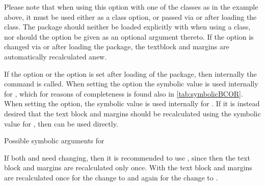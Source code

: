 Please note that when using this option with one of the {\KOMAScript}
classes as in the example above, it must be used either as a class
option, or passed via  or  after
loading the class. The  package should neither be
loaded explicitly with  when using a {\KOMAScript}
class, nor should the option be given as an optional argument
thereto. If the option is changed via  or
 after loading the package, the textblock and
margins are automatically recalculated anew.%
%
\EndIndexGroup


\begin{Declaration}
\end{Declaration}%
\begin{Explain}
  If the  option or the  option is set after
  loading of the  package, then internally the
  command  is called. When setting the 
  option the symbolic value  is used internally for
  , which for reasons of completeness is found also in
  \autoref{tab:symbolicBCOR}. When setting the  option,
  the symbolic value  is used internally for
  . If it is instead desired that the text block and
  margins should be recalculated using the symbolic value
   for , then
   can be used
  directly.
\end{Explain}

\begin{table}
  \caption[{Symoblic  arguments for
    }]{Possible symbolic  arguments for
    }
  \label{tab:symbolicBCOR}
  \begin{desctabular}
  \end{desctabular}
\end{table}

If both  and  need changing, then it is
recommended to use , since then the text block and
margins are recalculated only once. With
 the text block and margins are
recalculated once for the change to  and again for the
change to .


